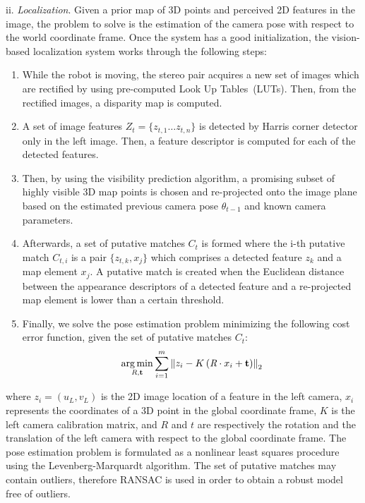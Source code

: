 ii. \textit{Localization}. Given a prior map of 3D points and perceived 2D features in the image, the problem to solve is the estimation of the camera pose with respect to the world coordinate frame. Once the system has a good initialization, the vision-based localization system works through the
following steps:
%
\begin{enumerate}
\item While the robot is moving, the stereo pair acquires a new set of images which are rectified by using pre-computed Look Up Tables~(LUTs). Then, from the rectified images, a disparity map is computed.
\item A set of image features $Z_{t}=\{z_{t,1} \ldots z_{t,n}\}$ is detected by Harris corner detector only in the left image. Then, a feature descriptor is computed for each of the detected features.
\item Then, by using the visibility prediction algorithm, a promising subset of highly visible 3D map points is chosen and re-projected onto the image plane based on the estimated previous camera pose $\theta_{t-1}$ and known camera parameters.
\item Afterwards, a set of putative matches $C_{t}$ is formed where the i-th putative match $C_{t,i}$ is a pair $\{z_{t,k},x_{j}\}$ which comprises a detected feature $z_{k}$ and a map element $x_{j}$. A putative match is created when the Euclidean distance between the appearance descriptors of a detected feature and a re-projected map element is lower than a certain threshold.
\item Finally, we solve the pose estimation problem minimizing the following cost error function, given the set of putative matches $C_{t}$:
%
\begin{equation} \label{eq:pose_estimation}
\argmin \limits_{\emph{R},\mathbf{t}} \sum \limits_{i=1}^{m} \left\|z_{i} - K \left(\emph{R}\cdot x_{i} + \mathbf{t} \right)\right\|_{2}
\end{equation}
%
\end{enumerate}
%
where $z_{i}=\left(u_{L},v_{L}\right)$ is the 2D image location of a feature in the left camera, $x_{i}$ represents the coordinates of a 3D point in the global coordinate frame, $K$ is the left camera calibration matrix, and $R$ and $t$ are respectively the rotation and the translation of the left camera with respect to the global coordinate frame. The pose estimation problem is formulated as a nonlinear least squares procedure using the Levenberg-Marquardt algorithm. The set of putative matches may contain outliers, therefore RANSAC is used in order to obtain a robust model free of outliers.

